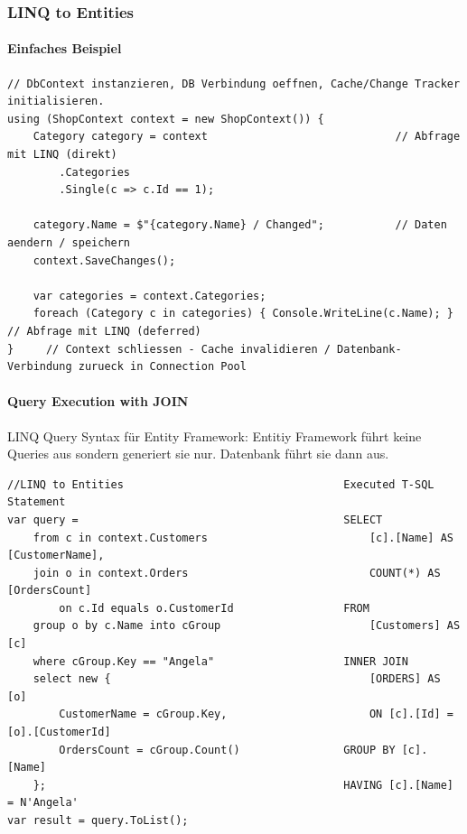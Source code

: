 \documentclass[
a4paper,
oneside,
10pt,
fleqn,
headsepline,
toc=listofnumbered, 
bibliography=totocnumbered]{scrartcl}
\begin{document}
\subsubsection{LINQ to Entities}
\paragraph{Einfaches Beispiel}
\begin{lstlisting} 
// DbContext instanzieren, DB Verbindung oeffnen, Cache/Change Tracker initialisieren.
using (ShopContext context = new ShopContext()) {          
    Category category = context                             // Abfrage mit LINQ (direkt)
        .Categories
        .Single(c => c.Id == 1);
        
    category.Name = $"{category.Name} / Changed";           // Daten aendern / speichern 
    context.SaveChanges();
    
    var categories = context.Categories;
    foreach (Category c in categories) { Console.WriteLine(c.Name); }       // Abfrage mit LINQ (deferred)
}     // Context schliessen - Cache invalidieren / Datenbank-Verbindung zurueck in Connection Pool
\end{lstlisting}

\paragraph{Query Execution with JOIN}
LINQ Query Syntax für Entity Framework:
Entitiy Framework führt keine Queries aus sondern generiert sie nur. Datenbank führt sie dann aus.
\begin{lstlisting}
//LINQ to Entities                                  Executed T-SQL Statement
var query =                                         SELECT
    from c in context.Customers                         [c].[Name] AS [CustomerName],
    join o in context.Orders                            COUNT(*) AS [OrdersCount]
        on c.Id equals o.CustomerId                 FROM
    group o by c.Name into cGroup                       [Customers] AS [c]
    where cGroup.Key == "Angela"                    INNER JOIN
    select new {                                        [ORDERS] AS [o]
        CustomerName = cGroup.Key,                      ON [c].[Id] = [o].[CustomerId]
        OrdersCount = cGroup.Count()                GROUP BY [c].[Name]
    };                                              HAVING [c].[Name] = N'Angela'
var result = query.ToList();
\end{lstlisting}
\end{document}

